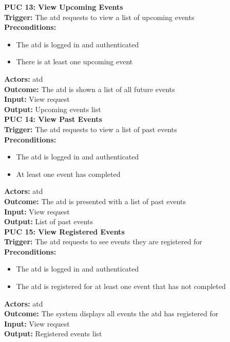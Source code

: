 \documentclass[12pt]{article}
\begin{document}
{\textbf{PUC 13: View Upcoming Events} \\
\textbf{Trigger:} The \gls{atd} requests to view a list of upcoming events \\
\textbf{Preconditions:}
\begin{itemize}
  \item The \gls{atd} is logged in and authenticated
  \item There is at least one upcoming event
\end{itemize}
\textbf{Actors:} \Gls{atd} \\
\textbf{Outcome:} The \gls{atd} is shown a list of all future events \\
\textbf{Input:} View request \\
\textbf{Output:} Upcoming events list \\[1em]

\textbf{PUC 14: View Past Events} \\
\textbf{Trigger:} The \gls{atd} requests to view a list of past events \\
\textbf{Preconditions:}
\begin{itemize}
  \item The \gls{atd} is logged in and authenticated
  \item At least one event has completed
\end{itemize}
\textbf{Actors:} \Gls{atd} \\
\textbf{Outcome:} The \gls{atd} is presented with a list of past events \\
\textbf{Input:} View request \\
\textbf{Output:} List of past events \\[1em]

\textbf{PUC 15: View Registered Events} \\
\textbf{Trigger:} The \gls{atd} requests to see events they are registered for \\
\textbf{Preconditions:}
\begin{itemize}
  \item The \gls{atd} is logged in and authenticated
  \item The \gls{atd} is registered for at least one event that has not completed
\end{itemize}
\textbf{Actors:} \Gls{atd} \\
\textbf{Outcome:} The system displays all events the \gls{atd} has registered for \\
\textbf{Input:} View request \\
\textbf{Output:} Registered events list \\[1em]

}
\end{document}
